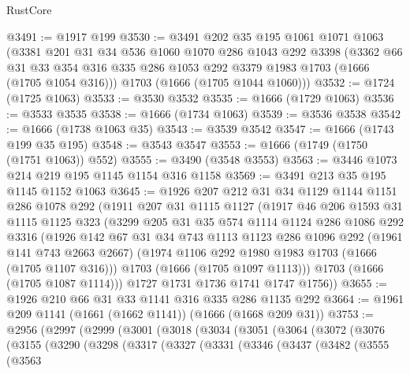 \begin{lexlean}{RustCore}
\begin{coremodule}
@3491 := @1917 @199
@3530 := @3491
    @202
    @35
    @195
    @1061
    @1071
    @1063
    (@3381
      @201
      @31
      @34
      @536
      @1060
      @1070
      @286
      @1043
      @292
      @3398
      (@3362
        @66
        @31
        @33
        @354
        @316
        @335
        @286
        @1053
        @292
        @3379
        @1983
        @1703
        (@1666 (@1705 @1054 @316)))
      @1703
      (@1666 (@1705 @1044 @1060)))
@3532 := @1724 (@1725 @1063)
@3533 := @3530 @3532
@3535 := @1666 (@1729 @1063)
@3536 := @3533 @3535
@3538 := @1666 (@1734 @1063)
@3539 := @3536 @3538
@3542 := @1666 (@1738 @1063 @35)
@3543 := @3539 @3542
@3547 := @1666 (@1743 @199 @35 @195)
@3548 := @3543 @3547
@3553 := @1666 (@1749 (@1750 (@1751 @1063)) @552)
@3555 := @3490 (@3548 @3553)
@3563 := @3446 @1073 @214 @219 @195 @1145 @1154 @316 @1158
@3569 := @3491 @213 @35 @195 @1145 @1152 @1063
@3645 := @1926
    @207
    @212
    @31
    @34
    @1129
    @1144
    @1151
    @286
    @1078
    @292
    (@1911
      @207
      @31
      @1115
      @1127
      (@1917
        @46
        @206
        @1593
        @31
        @1115
        @1125
        @323
        (@3299
          @205
          @31
          @35
          @574
          @1114
          @1124
          @286
          @1086
          @292
          @3316
          (@1926
            @142
            @67
            @31
            @34
            @743
            @1113
            @1123
            @286
            @1096
            @292
            (@1961 @141 @743 @2663 @2667)
            (@1974 @1106 @292 @1980 @1983 @1703 (@1666 (@1705 @1107 @316)))
            @1703
            (@1666 (@1705 @1097 @1113)))
          @1703
          (@1666 (@1705 @1087 @1114)))
        @1727
        @1731
        @1736
        @1741
        @1747
        @1756))
@3655 := @1926 @210 @66 @31 @33 @1141 @316 @335 @286 @1135 @292
@3664 := @1961 @209 @1141 (@1661 (@1662 @1141)) (@1666 (@1668 @209 @31))
@3753 := @2956
    (@2997
      (@2999
        (@3001
          (@3018
            (@3034
              (@3051
                (@3064
                  (@3072
                    (@3076
                      (@3155
                        (@3290
                          (@3298
                            (@3317
                              (@3327
                                (@3331
                                  (@3346
                                    (@3437
                                      (@3482
                                        (@3555
                                          (@3563

\end{coremodule}
\end{lexlean}
